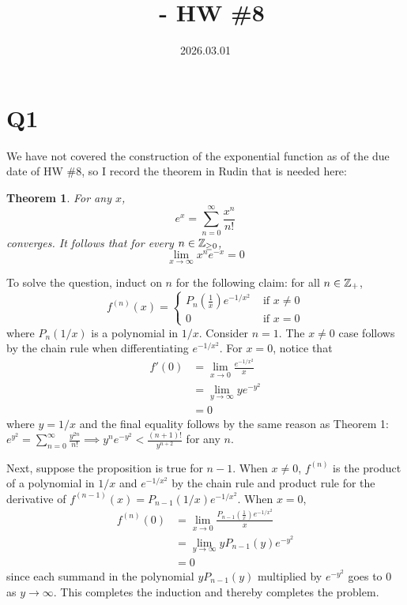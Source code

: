 \documentclass[12pt]{article}
\title{\course\ - HW \#8}
\author{\myname}
\date{2026.03.01}
\newtheorem{theorem}{Theorem}
\begin{document}
\maketitle
\thispagestyle{fancy}


\newcommand{\kder}[1]{\frac{d^[#1]}{dx^[#1]}}

\section*{Q1}
We have not covered the construction of the exponential function as of the due date of HW \#8, so I record the theorem in Rudin that is needed here: 
\begin{theorem}
  For any $x$,
  $$e^x = \sum_{n = 0}^{\infty} \frac{x^n}{n!}$$
  converges. 
  It follows that for every $n \in \mathbb{Z}_{\geq 0}$, 
  $$\lim_{x \rightarrow \infty} x^n e^{-x} = 0$$
\end{theorem}

To solve the question, induct on $n$ for the following claim: 
for all $n \in \mathbb{Z}_{+}$, 
$$f^{(n)}(x) = \begin{cases} P_n(\frac{1}{x}) e^{-1/x^2} & \text{ if } x \neq 0 \\ 0 & \text{ if } x = 0 \end{cases}$$
where $P_n(1/x)$ is a polynomial in $1/x$. 
Consider $n = 1$. 
The $x \neq 0$ case follows by the chain rule when differentiating $e^{-1/x^2}$. 
For $x = 0$, notice that 
\begin{align*}
  f'(0) & = \lim_{x \rightarrow 0} \frac{e^{-1/x^2}}{x}  \\ 
        & = \lim_{y \rightarrow \infty} ye^{-y^2} \\ 
        & = 0
\end{align*}
where $y = 1 / x$ and the final equality follows by the same reason as Theorem 1: 
$e^{y^2} = \sum_{n = 0}^{\infty} \frac{y^{2n}}{n!} \implies y^n e^{-y^2} < \frac{(n + 1)!}{y^{n + 2}}$ for any $n$. 

Next, suppose the proposition is true for $n - 1$. 
When $x \neq 0$, $f^{(n)}$ is the product of a polynomial in $1/x$ and $e^{-1/x^2}$ by the chain rule and product rule for the derivative of $f^{(n - 1)}(x) = P_{n - 1}(1/x) e^{-1/x^2}$. 
When $x = 0$, 
\begin{align*}
  f^{(n)}(0) & = \lim_{x \rightarrow 0} \frac{P_{n - 1}(\frac{1}{x}) e^{-1/x^2}}{x} \\ 
             & = \lim_{y \rightarrow \infty} yP_{n - 1}(y) e^{-y^2} \\ 
             & = 0
\end{align*}
since each summand in the polynomial $yP_{n - 1}(y)$ multiplied by $e^{-y^2}$ goes to 0 as $y \rightarrow \infty$. 
This completes the induction and thereby completes the problem. 
\end{document}
